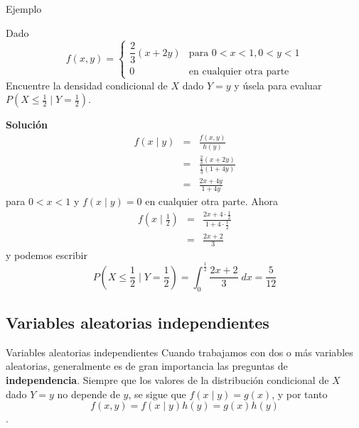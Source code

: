 \documentclass[11pt]{beamer}
\begin{document}
\begin{frame}{Ejemplo}

Dado
$$
f(x,y) =\left\{ \begin {matrix} 
\dfrac{2}{3}(x+2y) & \mbox{para } 0<x<1, 0<y<1 \\ 
0 & \mbox{en cualquier otra parte}
\end{matrix} \right . $$ 
Encuentre la densidad condicional de $X$ dado $Y=y$ y úsela para evaluar $P(X \le \frac{1}{2} \mid Y=\frac{1}{2}).$
\end{frame}


\begin{frame}{}

 {\bf Solución}
 \begin{eqnarray*}
f(x \mid y) &=& \frac{f(x,y)}{h(y)}  \\
&=&  \frac{ \frac{2}{3}(x+2y)}{ \frac{1}{3} (1+4y)}\\
&=& \frac{2x+4y}{1+4y}
\end{eqnarray*}
para $0<x<1$ y $f(x \mid y)=0$ en cualquier otra parte.
 Ahora
  \begin{eqnarray*}
f(x \mid \frac{1}{2} ) &=&  \frac{2x+4 \cdot \frac{1}{2}}{1+4 \cdot \frac{1}{2}} \\
&=& \frac{2x +2}{3}
\end{eqnarray*}
y podemos escribir
$$P(X \le \frac{1}{2} \mid Y=\frac{1}{2})= \int_0^{\frac{1}{2}}{\frac{2x+2}{3} \; dx}=\frac{5}{12}$$
\end{frame}


\subsection{Variables aleatorias independientes}
\begin{frame}{Variables aleatorias independientes}
Cuando trabajamos con dos o más variables aleatorias, generalmente es de gran importancia las preguntas de {\bf independencia}.  Siempre que los valores de la distribución condicional de $X$ dado $Y=y$ no depende de $y$, se sigue que $f(x \mid y)=g(x)$, y por tanto $$f(x,y)=f(x \mid y)h(y)=g(x)h(y)$$.

\end{frame}
\end{document}
